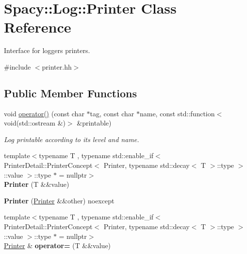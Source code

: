 \hypertarget{classSpacy_1_1Log_1_1Printer}{}\section{Spacy\+:\+:Log\+:\+:Printer Class Reference}
\label{classSpacy_1_1Log_1_1Printer}


Interface for logger\textquotesingle{}s printers.  




{\ttfamily \#include $<$printer.\+hh$>$}

\subsection*{Public Member Functions}
\begin{DoxyCompactItemize}
\item 
void \hyperlink{classSpacy_1_1Log_1_1Printer_a7cbc9a51fb4caf02a4fd46de907af6e9}{operator()} (const char $\ast$tag, const char $\ast$name, const std\+::function$<$ void(std\+::ostream \&)$>$ \&printable)
\begin{DoxyCompactList}\small\item\em Log printable according to its level and name. \end{DoxyCompactList}\item 
{\footnotesize template$<$typename T , typename std\+::enable\+\_\+if$<$ Printer\+Detail\+::\+Printer\+Concept$<$ Printer, typename std\+::decay$<$ T $>$\+::type $>$\+::value $>$\+::type $\ast$  = nullptr$>$ }\\{\bfseries Printer} (T \&\&value)\hypertarget{classSpacy_1_1Log_1_1Printer_a808ff6fbaed9e16053d829b9ac72a052}{}\label{classSpacy_1_1Log_1_1Printer_a808ff6fbaed9e16053d829b9ac72a052}

\item 
{\bfseries Printer} (\hyperlink{classSpacy_1_1Log_1_1Printer}{Printer} \&\&other) noexcept\hypertarget{classSpacy_1_1Log_1_1Printer_a6bf9ec926eff53a022105e92c590ee87}{}\label{classSpacy_1_1Log_1_1Printer_a6bf9ec926eff53a022105e92c590ee87}

\item 
{\footnotesize template$<$typename T , typename std\+::enable\+\_\+if$<$ Printer\+Detail\+::\+Printer\+Concept$<$ Printer, typename std\+::decay$<$ T $>$\+::type $>$\+::value $>$\+::type $\ast$  = nullptr$>$ }\\\hyperlink{classSpacy_1_1Log_1_1Printer}{Printer} \& {\bfseries operator=} (T \&\&value)\hypertarget{classSpacy_1_1Log_1_1Printer_ae357ead97367f658a1debecbd541e53f}{}\label{classSpacy_1_1Log_1_1Printer_ae357ead97367f658a1debecbd541e53f}


\end{DoxyCompactItemize}
